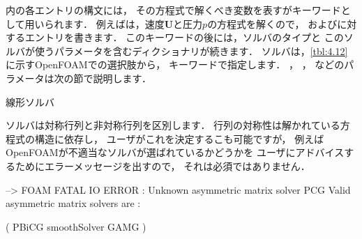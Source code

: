 内の各エントリの構文には，
その方程式で解くべき変数を表すがキーワードとして用いられます．
例えばは，速度$\bm{U}$と圧力$p$の方程式を解くので，
およびに対するエントリを書きます．
このキーワードの後には，ソルバのタイプと
このソルバが使うパラメータを含むディクショナリが続きます．
ソルバは，\autoref{tbl:4.12}に示すOpenFOAMでの選択肢から，
%
%
キーワードで指定します．
%
%
，
%
%
，
%
%
などのパラメータは次の節で説明します．


\begin{table}[ht]
 
 \caption{線形ソルバ}
 \label{tbl:4.12}
\end{table}


ソルバは対称行列と非対称行列を区別します．
行列の対称性は解かれている方程式の構造に依存し，
ユーザがこれを決定するこも可能ですが，
例えばOpenFOAMが不適当なソルバが選ばれているかどうかを
ユーザにアドバイスするためにエラーメッセージを出すので，
それは必須ではありません．
\begin{OFverbatim}[terminal]
--> FOAM FATAL IO ERROR : Unknown asymmetric matrix solver PCG
Valid asymmetric matrix solvers are :

(
PBiCG
smoothSolver
GAMG
)
\end{OFverbatim}

